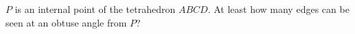 $P$ is an internal point of the tetrahedron $ABCD$. At least how many edges can be seen at an obtuse angle from $P$?
